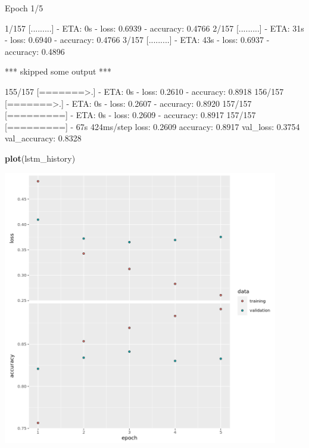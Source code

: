 \documentclass[12pt,]{krantz}
\makeatletter
\newenvironment{Shaded}{\begin{snugshade}}{\end{snugshade}}
\newcommand{\KeywordTok}[1]{\textcolor[rgb]{0.27,0.27,0.27}{\textbf{#1}}}
\newcommand{\NormalTok}[1]{#1}
\newcommand{\OperatorTok}[1]{\textcolor[rgb]{0.43,0.43,0.43}{\textbf{#1}}}
\newcommand{\StringTok}[1]{\textcolor[rgb]{0.5,0.5,0.5}{#1}}
\newenvironment{kframe}{%
\medskip{}
\setlength{\fboxsep}{.8em}
 \def\at@end@of@kframe{}%
 \ifinner\ifhmode%
  \def\at@end@of@kframe{\end{minipage}}%
  \begin{minipage}{\columnwidth}%
 \fi\fi%
 \def\FrameCommand##1{\hskip\@totalleftmargin \hskip-\fboxsep
 \colorbox{shadecolor}{##1}\hskip-\fboxsep
     \hskip-\linewidth \hskip-\@totalleftmargin \hskip\columnwidth}%
 \MakeFramed {\advance\hsize-\width
   \@totalleftmargin\z@ \linewidth\hsize
   \@setminipage}}%
 {\par\unskip\endMakeFramed%
 \at@end@of@kframe}
\renewenvironment{Shaded}{\begin{kframe}}{\end{kframe}}
\makeatother
\begin{document}
\begin{Shaded}
\begin{Highlighting}[]
\NormalTok{Epoch 1/5}

\NormalTok{  1/157 [.........] - ETA: 0s - loss: 0.6939 - accuracy: 0.4766}
\NormalTok{  2/157 [.........] - ETA: 31s - loss: 0.6940 - accuracy: 0.4766}
\NormalTok{  3/157 [.........] - ETA: 43s - loss: 0.6937 - accuracy: 0.4896}

\NormalTok{*** skipped some output ***}

\NormalTok{155/157 [=======>.] - ETA: 0s - loss: 0.2610 - accuracy: 0.8918}
\NormalTok{156/157 [=======>.] - ETA: 0s - loss: 0.2607 - accuracy: 0.8920}
\NormalTok{157/157 [=========] - ETA: 0s - loss: 0.2609 - accuracy: 0.8917}
\NormalTok{157/157 [=========] - 67s 424ms/step }
\NormalTok{loss: 0.2609 accuracy: 0.8917 val_loss: 0.3754 val_accuracy: 0.8328}
\end{Highlighting}
\end{Shaded}

\begin{Shaded}
\begin{Highlighting}[]
\KeywordTok{plot}\NormalTok{(lstm_history)}
\end{Highlighting}
\end{Shaded}

\includegraphics[width=0.9\textwidth,height=\textheight]{images/rnnhandson2.png}

\begin{Shaded}
\end{Shaded}
\end{document}
